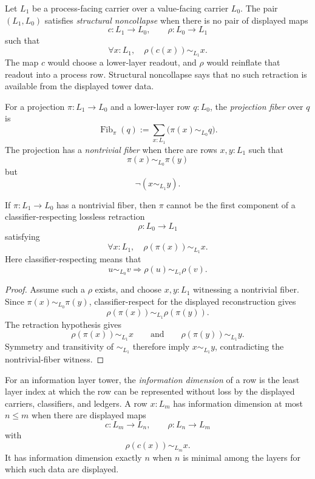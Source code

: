 \begin{definition}
\label{def:unified-reality-structural-noncollapse}
Let $L_1$ be a process-facing carrier over a value-facing carrier $L_0$.
The pair $(L_1,L_0)$ satisfies \emph{structural noncollapse} when there
is no pair of displayed maps
$$
c:L_1\to L_0,
\qquad
\rho:L_0\to L_1
$$
such that
$$
\forall x:L_1,\quad
\rho(c(x))\sim_{L_1}x.
$$
The map $c$ would choose a lower-layer readout, and $\rho$ would
reinflate that readout into a process row. Structural noncollapse says
that no such retraction is available from the displayed tower data.
\end{definition}

\begin{definition}
\label{def:unified-reality-projection-fiber}
For a projection $\pi:L_1\to L_0$ and a lower-layer row $q:L_0$, the
\emph{projection fiber} over $q$ is
$$
\operatorname{Fib}_{\pi}(q)
:=
\sum_{x:L_1}
\bigl(\pi(x)\sim_{L_0}q\bigr).
$$
The projection has a \emph{nontrivial fiber} when there are rows
$x,y:L_1$ such that
$$
\pi(x)\sim_{L_0}\pi(y)
$$
but
$$
\neg(x\sim_{L_1}y).
$$
\end{definition}

\begin{theorem}
\label{thm:unified-reality-nontrivial-fiber-obstructs-collapse}
If $\pi:L_1\to L_0$ has a nontrivial fiber, then $\pi$ cannot be the
first component of a classifier-respecting lossless retraction
$$
\rho:L_0\to L_1
$$
satisfying
$$
\forall x:L_1,\quad \rho(\pi(x))\sim_{L_1}x.
$$
Here classifier-respecting means that
$$
u\sim_{L_0}v
\Longrightarrow
\rho(u)\sim_{L_1}\rho(v).
$$
\end{theorem}

\begin{proof}
Assume such a $\rho$ exists, and choose $x,y:L_1$ witnessing a
nontrivial fiber. Since $\pi(x)\sim_{L_0}\pi(y)$, classifier-respect for
the displayed reconstruction gives
$$
\rho(\pi(x))\sim_{L_1}\rho(\pi(y)).
$$
The retraction hypothesis gives
$$
\rho(\pi(x))\sim_{L_1}x
\qquad\text{and}\qquad
\rho(\pi(y))\sim_{L_1}y.
$$
Symmetry and transitivity of $\sim_{L_1}$ therefore imply
$x\sim_{L_1}y$, contradicting the nontrivial-fiber witness.
\end{proof}

\begin{definition}
\label{def:unified-reality-information-dimension}
For an information layer tower, the \emph{information dimension} of a
row is the least layer index at which the row can be represented without
loss by the displayed carriers, classifiers, and ledgers. A row
$x:L_m$ has information dimension at most $n\leq m$ when there are
displayed maps
$$
c:L_m\to L_n,
\qquad
\rho:L_n\to L_m
$$
with
$$
\rho(c(x))\sim_{L_m}x.
$$
It has information dimension exactly $n$ when $n$ is minimal among the
layers for which such data are displayed.
\end{definition}


